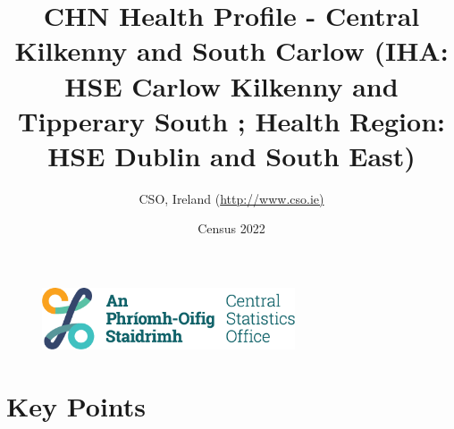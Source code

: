 \documentclass{article}
\title{CHN Health Profile - Central Kilkenny and South Carlow (IHA: HSE Carlow Kilkenny and Tipperary South ;  Health Region: HSE Dublin and South East) }
\date{Census 2022}
\author{CSO, Ireland  (\url{http://www.cso.ie)}}
\begin{document}


\begin{figure}
	\centering
\includegraphics[width =75mm]{../figures/CSO_Logo.png}
\end{figure}

				 
		   
						  
														  
																																													
												 
			 
\maketitle
					
													   
				 
						 
																																																																											   
				 
				  
  \pagebreak
    	    \tableofcontents

\pagebreak


\section{Key Points}
\end{document}
